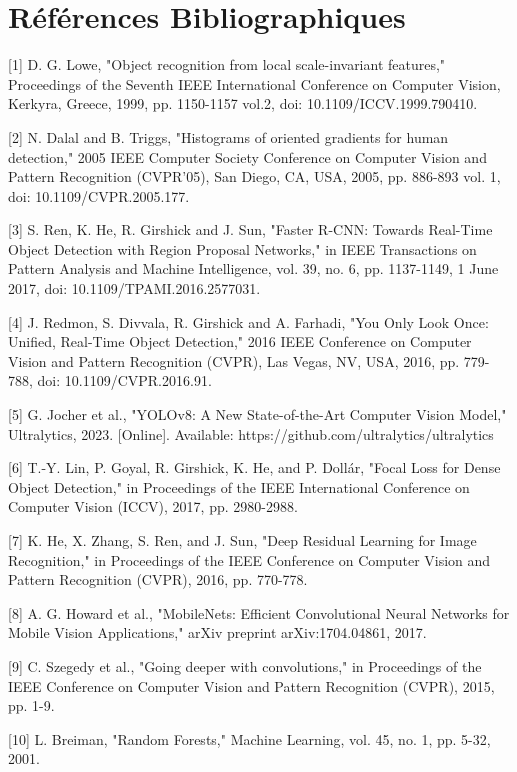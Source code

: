 \documentclass[journal]{IEEEtran}
\begin{document}
\clearpage

\printbibliography

\section*{Références Bibliographiques}

[1] D. G. Lowe, "Object recognition from local scale-invariant features," Proceedings of the Seventh IEEE International Conference on Computer Vision, Kerkyra, Greece, 1999, pp. 1150-1157 vol.2, doi: 10.1109/ICCV.1999.790410.

[2] N. Dalal and B. Triggs, "Histograms of oriented gradients for human detection," 2005 IEEE Computer Society Conference on Computer Vision and Pattern Recognition (CVPR'05), San Diego, CA, USA, 2005, pp. 886-893 vol. 1, doi: 10.1109/CVPR.2005.177.

[3] S. Ren, K. He, R. Girshick and J. Sun, "Faster R-CNN: Towards Real-Time Object Detection with Region Proposal Networks," in IEEE Transactions on Pattern Analysis and Machine Intelligence, vol. 39, no. 6, pp. 1137-1149, 1 June 2017, doi: 10.1109/TPAMI.2016.2577031.

[4] J. Redmon, S. Divvala, R. Girshick and A. Farhadi, "You Only Look Once: Unified, Real-Time Object Detection," 2016 IEEE Conference on Computer Vision and Pattern Recognition (CVPR), Las Vegas, NV, USA, 2016, pp. 779-788, doi: 10.1109/CVPR.2016.91.

[5] G. Jocher et al., "YOLOv8: A New State-of-the-Art Computer Vision Model," Ultralytics, 2023. [Online]. Available: https://github.com/ultralytics/ultralytics

[6] T.-Y. Lin, P. Goyal, R. Girshick, K. He, and P. Dollár, "Focal Loss for Dense Object Detection," in Proceedings of the IEEE International Conference on Computer Vision (ICCV), 2017, pp. 2980-2988.

[7] K. He, X. Zhang, S. Ren, and J. Sun, "Deep Residual Learning for Image Recognition," in Proceedings of the IEEE Conference on Computer Vision and Pattern Recognition (CVPR), 2016, pp. 770-778.

[8] A. G. Howard et al., "MobileNets: Efficient Convolutional Neural Networks for Mobile Vision Applications," arXiv preprint arXiv:1704.04861, 2017.

[9] C. Szegedy et al., "Going deeper with convolutions," in Proceedings of the IEEE Conference on Computer Vision and Pattern Recognition (CVPR), 2015, pp. 1-9.

[10] L. Breiman, "Random Forests," Machine Learning, vol. 45, no. 1, pp. 5-32, 2001.
\end{document}
